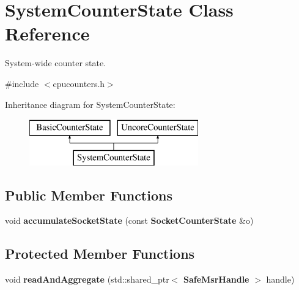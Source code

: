 \section{System\+Counter\+State Class Reference}
\label{classSystemCounterState}


System-\/wide counter state.  




{\ttfamily \#include $<$cpucounters.\+h$>$}

Inheritance diagram for System\+Counter\+State\+:\begin{figure}[H]
\begin{center}
\leavevmode
\includegraphics[height=2.000000cm]{classSystemCounterState}
\end{center}
\end{figure}
\subsection*{Public Member Functions}
\begin{DoxyCompactItemize}
\item 
void {\bfseries accumulate\+Socket\+State} (const {\bf Socket\+Counter\+State} \&o)\label{classSystemCounterState_af8fb0cdf2c4d03ec03b1ef2e4c27aac4}

\end{DoxyCompactItemize}
\subsection*{Protected Member Functions}
\begin{DoxyCompactItemize}
\item 
void {\bfseries read\+And\+Aggregate} (std\+::shared\+\_\+ptr$<$ {\bf Safe\+Msr\+Handle} $>$ handle)\label{classSystemCounterState_a1755dd4a5ffc57d0423620336aab534b}

\end{DoxyCompactItemize}
